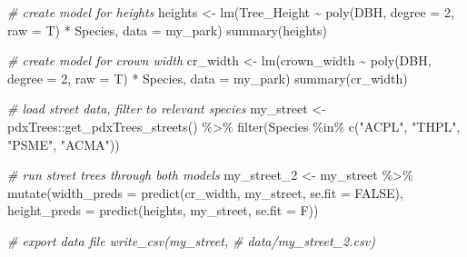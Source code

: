 \documentclass[12pt,twoside]{reedthesis}
\newenvironment{Shaded}{\begin{snugshade}}{\end{snugshade}}
\newcommand{\AttributeTok}[1]{\textcolor[rgb]{0.77,0.63,0.00}{#1}}
\newcommand{\CommentTok}[1]{\textcolor[rgb]{0.56,0.35,0.01}{\textit{#1}}}
\newcommand{\ConstantTok}[1]{\textcolor[rgb]{0.00,0.00,0.00}{#1}}
\newcommand{\DecValTok}[1]{\textcolor[rgb]{0.00,0.00,0.81}{#1}}
\newcommand{\FunctionTok}[1]{\textcolor[rgb]{0.00,0.00,0.00}{#1}}
\newcommand{\NormalTok}[1]{#1}
\newcommand{\OtherTok}[1]{\textcolor[rgb]{0.56,0.35,0.01}{#1}}
\newcommand{\SpecialCharTok}[1]{\textcolor[rgb]{0.00,0.00,0.00}{#1}}
\newcommand{\StringTok}[1]{\textcolor[rgb]{0.31,0.60,0.02}{#1}}
\begin{document}
\footnotesize
\begin{Shaded}
\begin{Highlighting}[]
\CommentTok{\# create model for heights}
\NormalTok{heights }\OtherTok{\textless{}{-}} \FunctionTok{lm}\NormalTok{(Tree\_Height }\SpecialCharTok{\textasciitilde{}} \FunctionTok{poly}\NormalTok{(DBH, }\AttributeTok{degree =} \DecValTok{2}\NormalTok{, }\AttributeTok{raw =}\NormalTok{ T) }\SpecialCharTok{*}
\NormalTok{    Species, }\AttributeTok{data =}\NormalTok{ my\_park)}
\FunctionTok{summary}\NormalTok{(heights)}

\CommentTok{\# create model for crown width}
\NormalTok{cr\_width }\OtherTok{\textless{}{-}} \FunctionTok{lm}\NormalTok{(crown\_width }\SpecialCharTok{\textasciitilde{}} \FunctionTok{poly}\NormalTok{(DBH, }\AttributeTok{degree =} \DecValTok{2}\NormalTok{, }\AttributeTok{raw =}\NormalTok{ T) }\SpecialCharTok{*}
\NormalTok{    Species, }\AttributeTok{data =}\NormalTok{ my\_park)}
\FunctionTok{summary}\NormalTok{(cr\_width)}

\CommentTok{\# load street data, filter to relevant species}
\NormalTok{my\_street }\OtherTok{\textless{}{-}}\NormalTok{ pdxTrees}\SpecialCharTok{::}\FunctionTok{get\_pdxTrees\_streets}\NormalTok{() }\SpecialCharTok{\%\textgreater{}\%}
    \FunctionTok{filter}\NormalTok{(Species }\SpecialCharTok{\%in\%} \FunctionTok{c}\NormalTok{(}\StringTok{"ACPL"}\NormalTok{, }\StringTok{"THPL"}\NormalTok{, }\StringTok{"PSME"}\NormalTok{, }\StringTok{"ACMA"}\NormalTok{))}

\CommentTok{\# run street trees through both models}
\NormalTok{my\_street\_2 }\OtherTok{\textless{}{-}}\NormalTok{ my\_street }\SpecialCharTok{\%\textgreater{}\%}
    \FunctionTok{mutate}\NormalTok{(}\AttributeTok{width\_preds =} \FunctionTok{predict}\NormalTok{(cr\_width, my\_street, }\AttributeTok{se.fit =} \ConstantTok{FALSE}\NormalTok{),}
        \AttributeTok{height\_preds =} \FunctionTok{predict}\NormalTok{(heights, my\_street, }\AttributeTok{se.fit =}\NormalTok{ F))}

\CommentTok{\# export data file write\_csv(my\_street,}
\CommentTok{\# \textquotesingle{}data/my\_street\_2.csv\textquotesingle{})}


\end{Highlighting}
\end{Shaded}
\end{document}
